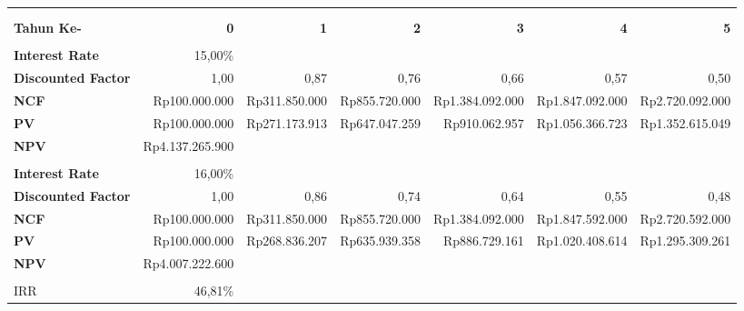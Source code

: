 \begin{tabular}{|>{\scriptsize}p{1.4cm}|>{\scriptsize}r|>{\scriptsize}r|>{\scriptsize}r|>{\scriptsize}r|>{\scriptsize}r|>{\scriptsize}r|}
\multicolumn{7}{c}{}\\
\multicolumn{7}{c}{\textbf{ANALISIS KELAYAKAN USAHA}}\\
\hline
\textbf{Tahun Ke-} & \textbf{0} & \textbf{1} & \textbf{2} & \textbf{3} & \textbf{4} & \textbf{5}\\
\hline
\multicolumn{7}{c}{}\\
\hline
\textbf{Interest Rate} & 15,00\% & \multicolumn{5}{c|}{}\\
\hline
\textbf{Discounted Factor} & 1,00 & 0,87 & 0,76 & 0,66 & 0,57 & 0,50\\
\hline
\textbf{NCF} & Rp100.000.000 & Rp311.850.000 & Rp855.720.000 & Rp1.384.092.000 & Rp1.847.092.000 & Rp2.720.092.000\\
\hline
\textbf{PV} & Rp100.000.000 & Rp271.173.913 & Rp647.047.259 & Rp910.062.957 & Rp1.056.366.723 & Rp1.352.615.049\\
\hline
\textbf{NPV} & Rp4.137.265.900 & \multicolumn{5}{c|}{}\\
\hline
\multicolumn{7}{c}{}\\
\hline
\textbf{Interest Rate} & 16,00\% & \multicolumn{5}{c|}{}\\
\hline
\textbf{Discounted Factor} & 1,00 & 0,86 & 0,74 & 0,64 & 0,55 & 0,48\\
\hline
\textbf{NCF} & Rp100.000.000 & Rp311.850.000 & Rp855.720.000 & Rp1.384.092.000 & Rp1.847.592.000 & Rp2.720.592.000\\
\hline
\textbf{PV} & Rp100.000.000 & Rp268.836.207 & Rp635.939.358 & Rp886.729.161 & Rp1.020.408.614 & Rp1.295.309.261\\
\hline
\textbf{NPV} & Rp4.007.222.600 & \multicolumn{5}{c|}{}\\
\hline
\multicolumn{7}{c}{}\\
\hline
IRR & 46,81\% & \multicolumn{5}{c|}{}\\
\hline
\end{tabular}
